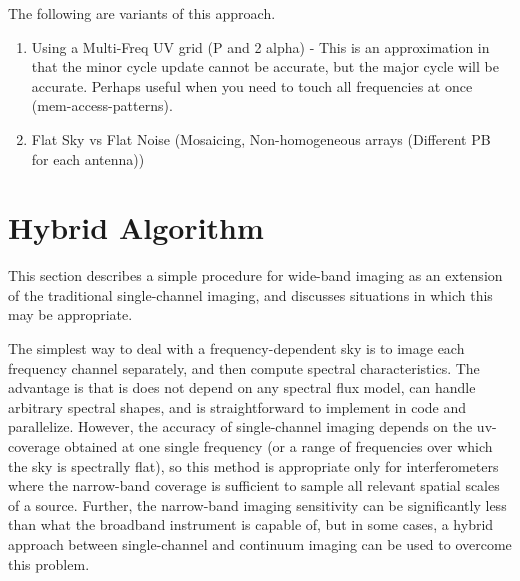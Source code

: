 \documentclass[structabstract]{aa}
\begin{document}
The following are variants of this approach.
\begin{enumerate}
\item Using a Multi-Freq UV grid (P and 2 alpha) - This is an approximation in that the minor cycle update cannot be accurate, but the major cycle will be accurate. Perhaps useful when you need to touch all frequencies at once (mem-access-patterns).
\item Flat Sky vs Flat Noise (Mosaicing, Non-homogeneous arrays (Different PB for each antenna))
\end{enumerate}

\section{Hybrid Algorithm}\label{HYBRID}
This section describes a simple procedure for wide-band imaging as an extension of the traditional
single-channel imaging, and discusses situations in which this may be appropriate.

The simplest way to deal with a frequency-dependent sky is to image each frequency channel
separately, and then compute spectral characteristics. The advantage is that is does not depend
on any spectral flux model, can handle arbitrary spectral shapes, and is straightforward to
implement in code and parallelize. 
However, the accuracy of single-channel imaging depends on the uv-coverage obtained at one
single frequency (or a range of frequencies over which the sky is spectrally flat), so this method
is appropriate only for interferometers where the narrow-band coverage is sufficient to sample
all relevant spatial scales of a source.  
Further, the narrow-band imaging sensitivity can be 
significantly less than what the broadband instrument is capable of, but 
in some cases, a hybrid approach between single-channel and continuum imaging can be used to
overcome this problem. 
\end{document}
